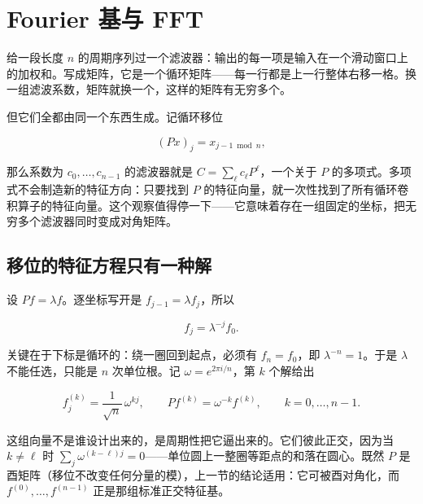 \section{Fourier 基与 FFT}
\label{sec:03-Linear-Algebra/08-Complex-Matrices-and-Fourier-Structure/03}

给一段长度 \(n\) 的周期序列过一个滤波器：输出的每一项是输入在一个滑动窗口上的加权和。写成矩阵，它是一个循环矩阵——每一行都是上一行整体右移一格。换一组滤波系数，矩阵就换一个，这样的矩阵有无穷多个。

但它们全都由同一个东西生成。记循环移位

\[
(Px)_j=x_{j-1\bmod n},
\]

那么系数为 \(c_0,\ldots,c_{n-1}\) 的滤波器就是 \(C=\sum_{\ell}c_\ell P^\ell\)，一个关于 \(P\) 的多项式。多项式不会制造新的特征方向：只要找到 \(P\) 的特征向量，就一次性找到了所有循环卷积算子的特征向量。这个观察值得停一下——它意味着存在一组固定的坐标，把无穷多个滤波器同时变成对角矩阵。

\subsection{移位的特征方程只有一种解}

设 \(Pf=\lambda f\)。逐坐标写开是 \(f_{j-1}=\lambda f_j\)，所以

\[
f_j=\lambda^{-j}f_0 .
\]

关键在于下标是循环的：绕一圈回到起点，必须有 \(f_n=f_0\)，即 \(\lambda^{-n}=1\)。于是 \(\lambda\) 不能任选，只能是 \(n\) 次单位根。记 \(\omega=e^{2\pi i/n}\)，第 \(k\) 个解给出

\[
f^{(k)}_j=\frac1{\sqrt n}\,\omega^{kj},
\qquad
Pf^{(k)}=\omega^{-k}f^{(k)},
\qquad k=0,\ldots,n-1 .
\]

这组向量不是谁设计出来的，是周期性把它逼出来的。它们彼此正交，因为当 \(k\ne\ell\) 时 \(\sum_{j}\omega^{(k-\ell)j}=0\)——单位圆上一整圈等距点的和落在圆心。既然 \(P\) 是酉矩阵（移位不改变任何分量的模），上一节的结论适用：它可被酉对角化，而 \(f^{(0)},\ldots,f^{(n-1)}\) 正是那组标准正交特征基。

